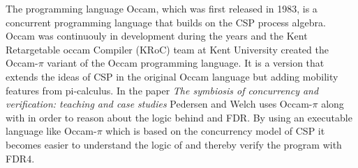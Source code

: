 The programming language Occam\cite{Occam1995}, which was first released in 1983, is a concurrent programming language that builds on the CSP process algebra. Occam was continuouly in development during the years and the Kent Retargetable occam Compiler (KRoC) team at Kent University created the Occam-$\pi$\cite{UniveristyofKent} variant of the Occam programming language. It is a version that extends the ideas of CSP in the original Occam language but adding mobility features from pi-calculus. In the paper \textit{The symbiosis of concurrency and verification: teaching and case studies}\cite{Pedersen2018} Pedersen and Welch uses Occam-$\pi$ along with \cspm in order to reason about the logic behind \cspm and FDR. By using an executable language like Occam-$\pi$ which is based on the concurrency model of CSP it becomes easier to understand the logic of \cspm and thereby verify the program with FDR4.\\\\


